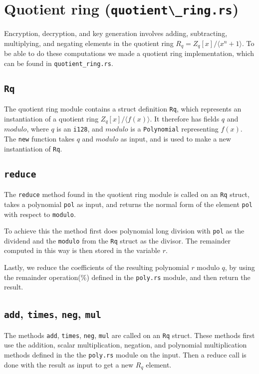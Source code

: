 \documentclass{article}
\begin{document}
\section{Quotient ring (\lstinline{quotient\_ring.rs})}
Encryption, decryption, and key generation involves adding, subtracting, multiplying, and negating elements in the quotient ring $R_q = Z_q[x]/\langle x^n + 1 \rangle$. To be able to do these computations we made a quotient ring implementation, which can be found in \lstinline{quotient_ring.rs}.

\subsection{\lstinline{Rq}}
The quotient ring module contains a struct definition \lstinline{Rq}, which represents an instantiation of a quotient ring $Z_q[x]/\langle f(x) \rangle$. It therefore has fields $q$ and $modulo$, where $q$ is an \lstinline{i128}, and $modulo$ is a \lstinline{Polynomial} representing $f(x)$. The \lstinline{new} function takes $q$ and $modulo$ as input, and is used to make a new instantiation of \lstinline{Rq}.

\subsection{\lstinline{reduce}}
The \lstinline{reduce} method found in the quotient ring module is called on an \lstinline{Rq} struct, takes a polynomial \lstinline{pol} as input, and returns the normal form of the element \lstinline{pol} with respect to \lstinline{modulo}.

To achieve this the method first does polynomial long division with \lstinline{pol} as the dividend and the \lstinline{modulo} from the \lstinline{Rq} struct as the divisor. The remainder computed in this way is then stored in the variable $r$.

Lastly, we reduce the coefficients of the resulting polynomial $r$ modulo $q$, by using the remainder operation($\%$) defined in the \lstinline{poly.rs} module, and then return the result.

\subsection{\lstinline{add}, \lstinline{times}, \lstinline{neg}, \lstinline{mul}}
The methods \lstinline{add}, \lstinline{times}, \lstinline{neg}, \lstinline{mul} are called on an \lstinline{Rq} struct. These methods first use the addition, scalar multiplication, negation, and polynomial multiplication methods defined in the the \lstinline{poly.rs} module on the input. Then a reduce call is done with the result as input to get a new $R_q$ element.
\end{document}
